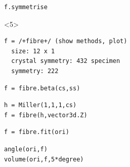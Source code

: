 \documentclass[compress]{beamer}
\begin{document}
\begin{frame}[fragile]
\begin{columns}
\begin{column}{7cm}
\begin{overlayarea}{\textwidth}{8cm}
\begin{lstlisting}[style=input]
f.symmetrise
\end{lstlisting}
\begin{onlyenv}<5>
  \vspace{-0.3cm}
\begin{lstlisting}[style=output]
f = /+fibre+/ (show methods, plot)
  size: 12 x 1
  crystal symmetry: 432 specimen
  symmetry: 222
\end{lstlisting}
\end{onlyenv}

\pause

\vspace{-0.2cm}
\begin{lstlisting}[style=input]
f = fibre.beta(cs,ss)
\end{lstlisting}

\pause

\vspace{-0.2cm}
\begin{lstlisting}[style=input]
h = Miller(1,1,1,cs)
f = fibre(h,vector3d.Z)
\end{lstlisting}

\pause

\vspace{-0.2cm}
\begin{lstlisting}[style=input]
f = fibre.fit(ori)
\end{lstlisting}

\pause

\vspace{-0.2cm}
\begin{lstlisting}[style=input]
angle(ori,f)
volume(ori,f,5*degree)
\end{lstlisting}

\end{overlayarea}
\end{column}


\end{columns}
\end{frame}
\end{document}
